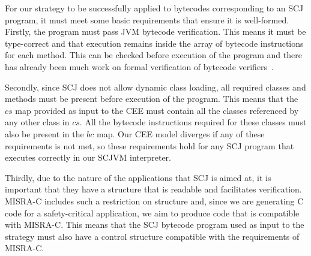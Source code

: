 For our strategy to be successfully applied to bytecodes corresponding
to an SCJ program, it must meet some basic requirements that ensure it
is well-formed.
Firstly, the program must pass JVM bytecode verification.
This means it must be type-correct and that execution remains inside
the array of bytecode instructions for each method.
This can be checked before execution of the program and there has
already been much work on formal verification of bytecode
verifiers~\cite{coglio2000,klein2003,xavier2003}.

Secondly, since SCJ does not allow dynamic class loading, all required
classes and methods must be present before execution of the program.
This means that the $cs$ map provided as input to the CEE must contain
all the classes referenced by any other class in $cs$.
All the bytecode instructions required for these classes must also be
present in the $bc$ map.
Our CEE model diverges if any of these requirements is not met, so
these requirements hold for any SCJ program that executes correctly in
our SCJVM interpreter.

Thirdly, due to the nature of the applications that SCJ is aimed at,
it is important that they have a structure that is readable and
facilitates verification.
MISRA-C includes such a restriction on structure and, since we are
generating C code for a safety-critical application, we aim to produce
code that is compatible with MISRA-C.
This means that the SCJ bytecode program used as input to the strategy
must also have a control structure compatible with the requirements of
MISRA-C.

